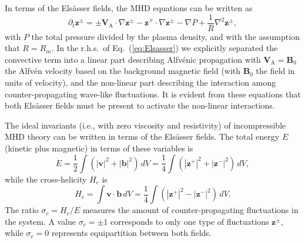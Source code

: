 \documentclass[aip,pop,reprint,amsmath,amssymb,floatfix]{revtex4-1}
\renewcommand{\vec}[1]{\mathbf{#1}}
\begin{document}
In terms of the Els\"asser fields, the MHD equations can be written
\cite{servidio_time_2011} as
\begin{equation}
\partial_t \vec{z}^\pm = \pm \vec{V}_\textrm{A} \cdot \nabla
\vec{z}^\pm - \vec{z}^\mp \cdot \nabla \vec{z}^\pm - \nabla{P} +
\frac{1}{R} \nabla^2 \vec{z}^\pm ,
\label{eq:Elsasser}
\end{equation}
with $P$ the total pressure divided by the plasma density, and with
the assumption that $R=R_m$. In the r.h.s.~of Eq.~(\ref{eq:Elsasser}) 
we explicitly separated the convective term into a linear part 
describing Alfv\'enic propagation with $\vec{V}_\textrm{A} = \vec{B}_0$ 
the Alfv\'en velocity based on the background magnetic field (with
$\vec{B}_0$ the field in units of velocity), and the non-linear part
describing the interaction among counter-propagating wave-like 
fluctuations. It is evident from these equations that both Els\"asser 
fields must be present to activate the non-linear interactions.

The ideal invariants (i.e., with zero viscosity and resistivity) of
incompressible MHD theory can be written in terms of the Els\"asser
fields. The total energy $E$ (kinetic plus magnetic) in terms of these
variables is
\begin{equation}
E = \frac{1}{2}\int{\left(\left|\vec{v}\right|^2 +
    \left|\vec{b}\right|^2 \right)\,dV} =
    \frac{1}{4}\int{\left(\left|\vec{z}^+\right|^2 +
    \left|\vec{z}^-\right|^2 \right)\,dV},
\label{eq:ener}
\end{equation}
while the cross-helicity $H_c$ is
\begin{equation}
H_c = \int{\vec{v}\cdot\vec{b} \, dV} =
    \frac{1}{4}\int{\left(\left|\vec{z}^+\right|^2 
    - \left|\vec{z}^-\right|^2 \right)\,dV} .
\label{eq:cross}
\end{equation}
The ratio $\sigma_c = H_c/E$ measures the amount of counter-propagating
fluctuations in the system. A value $\sigma_c = \pm 1$ corresponds to
only one type of fluctuations $\vec{z}^\pm$, while $\sigma_c=0$
represents equipartition between both fields.
\end{document}
